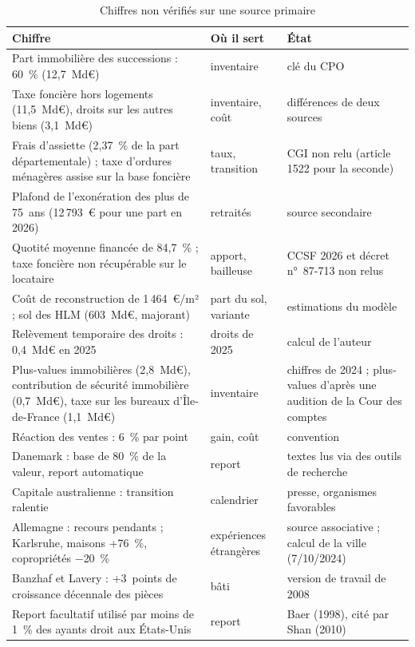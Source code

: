 \documentclass[11pt,a4paper]{article}
\begin{document}
\begin{table}[!htbp]\centering\scriptsize
\caption{Chiffres non vérifiés sur une source primaire}\label{tab:fon_nv}
\begin{tabularx}{\linewidth}{@{}>{\raggedright\arraybackslash}p{5.4cm}>{\raggedright\arraybackslash}p{2.6cm}>{\raggedright\arraybackslash}X@{}}
\toprule
Chiffre & Où il sert & État \\
\midrule
Part immobilière des successions : 60~\% (12,7~Md€) & inventaire & clé du CPO \\
Taxe foncière hors logements (11,5~Md€), droits sur les autres biens (3,1~Md€) & inventaire, coût & différences de deux sources \\
Frais d'assiette (2,37~\% de la part départementale) ; taxe d'ordures ménagères assise sur la base foncière & taux, transition & CGI non relu (article 1522 pour la seconde) \\
Plafond de l'exonération des plus de 75~ans (12\,793~€ pour une part en 2026) & retraités & source secondaire \\
Quotité moyenne financée de 84,7~\% ; taxe foncière non récupérable sur le locataire & apport, bailleuse & CCSF 2026 et décret n°~87-713 non relus \\
Coût de reconstruction de 1\,464~€/m² ; sol des HLM (603~Md€, majorant) & part du sol, variante & estimations du modèle \\
Relèvement temporaire des droits : 0,4~Md€ en 2025 & droits de 2025 & calcul de l'auteur \\
Plus-values immobilières (2,8~Md€), contribution de sécurité immobilière (0,7~Md€), taxe sur les bureaux d'Île-de-France (1,1~Md€) & inventaire & chiffres de 2024 ; plus-values d'après une audition de la Cour des comptes \\
Réaction des ventes : 6~\% par point & gain, coût & convention \\
Danemark : base de 80~\% de la valeur, report automatique & report & textes lus via des outils de recherche \\
Capitale australienne : transition ralentie & calendrier & presse, organismes favorables \\
Allemagne : recours pendants ; Karlsruhe, maisons +76~\%, copropriétés $-$20~\% & expériences étrangères & source associative ; calcul de la ville (7/10/2024) \\
Banzhaf et Lavery : +3~points de croissance décennale des pièces & bâti & version de travail de 2008 \\
Report facultatif utilisé par moins de 1~\% des ayants droit aux États-Unis & report & Baer (1998), cité par Shan (2010) \\
\bottomrule
\end{tabularx}
\end{table}
\end{document}
